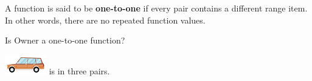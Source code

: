 \documentclass{ximera}
\begin{document}
\begin{definition}
  A function is said to be \textbf{one-to-one} if every pair contains a different range item.   In other words, there are no repeated function values.
  
\end{definition}



\begin{exercise}
 Is Owner a one-to-one function?
  \begin{multipleChoice}
  \end{multipleChoice}
  \begin{feedback}
\includegraphics[width=68px,height=32px]{pics/elements/cars/cars3.png} is in three pairs.
  \end{feedback}
\end{exercise}
\end{document}
